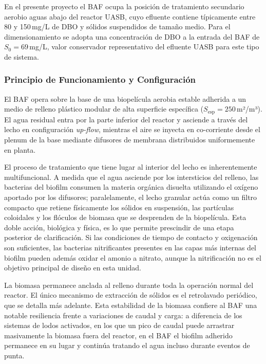 \documentclass[12pt,a4paper]{article}
\begin{document}
En el presente proyecto el BAF ocupa la posición de tratamiento secundario aerobio aguas abajo del reactor UASB, cuyo efluente contiene típicamente entre 80 y 150\,mg/L de DBO y sólidos suspendidos de tamaño medio. Para el dimensionamiento se adopta una concentración de DBO a la entrada del BAF de $S_0 = 69$\,mg/L, valor conservador representativo del efluente UASB para este tipo de sistema.

\subsubsection*{Principio de Funcionamiento y Configuración}

El BAF opera sobre la base de una biopelícula aerobia estable adherida a un medio de relleno plástico modular de alta superficie específica ($S_{\text{esp}} = 250$\,m²/m³). El agua residual entra por la parte inferior del reactor y asciende a través del lecho en configuración \textit{up-flow}, mientras el aire se inyecta en co-corriente desde el plenum de la base mediante difusores de membrana distribuidos uniformemente en planta.

El proceso de tratamiento que tiene lugar al interior del lecho es inherentemente multifuncional. A medida que el agua asciende por los intersticios del relleno, las bacterias del biofilm consumen la materia orgánica disuelta utilizando el oxígeno aportado por los difusores; paralelamente, el lecho granular actúa como un filtro compacto que retiene físicamente los sólidos en suspensión, las partículas coloidales y los flóculos de biomasa que se desprenden de la biopelícula. Esta doble acción, biológica y física, es lo que permite prescindir de una etapa posterior de clarificación. Si las condiciones de tiempo de contacto y oxigenación son suficientes, las bacterias nitrificantes presentes en las capas más internas del biofilm pueden además oxidar el amonio a nitrato, aunque la nitrificación no es el objetivo principal de diseño en esta unidad.

La biomasa permanece anclada al relleno durante toda la operación normal del reactor. El único mecanismo de extracción de sólidos es el retrolavado periódico, que se detalla más adelante. Esta estabilidad de la biomasa confiere al BAF una notable resiliencia frente a variaciones de caudal y carga: a diferencia de los sistemas de lodos activados, en los que un pico de caudal puede arrastrar masivamente la biomasa fuera del reactor, en el BAF el biofilm adherido permanece en su lugar y continúa tratando el agua incluso durante eventos de punta.
\end{document}
